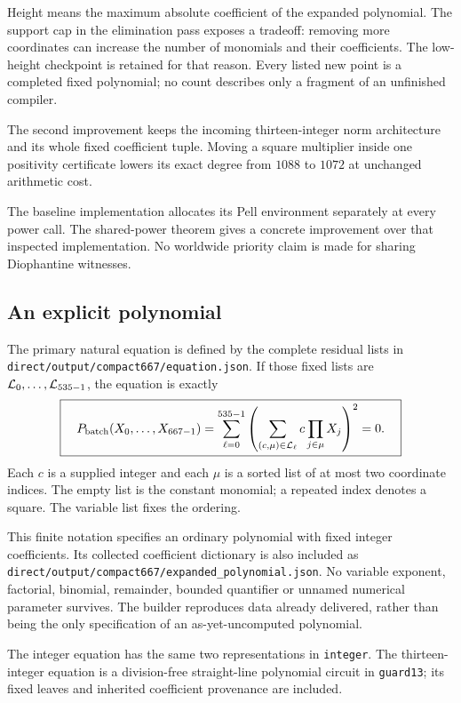 \documentclass[11pt,letterpaper]{article}
\newcommand{\file}[1]{\nolinkurl{#1}}
\begin{document}


Height means the maximum absolute coefficient of the expanded
polynomial. The support cap in the elimination pass exposes a tradeoff:
removing more coordinates can increase the number of monomials and
their coefficients. The low-height checkpoint is retained for that
reason. Every listed new point is a completed fixed polynomial;
no count describes only a fragment of an unfinished compiler.

The second improvement keeps the incoming thirteen-integer norm
architecture and its whole fixed coefficient tuple. Moving a square
multiplier inside one positivity certificate lowers its exact degree
from $1088$ to $1072$ at unchanged arithmetic cost.

The baseline implementation allocates its Pell environment separately
at every power call. The shared-power theorem gives a concrete
improvement over that inspected implementation. No worldwide
priority claim is made for sharing Diophantine witnesses.

\subsection{An explicit polynomial}

The primary natural equation is defined by the complete residual lists in
\file{direct/output/compact667/equation.json}. If those fixed lists are
$\mathcal L_0,\ldots,\mathcal L_{535-1}$, the equation is exactly
\begin{equation}
\boxed{\quad
 P_{\mathrm{batch}}(X_0,\ldots,X_{667-1})
 =
 \sum_{\ell=0}^{535-1}
 \left(\sum_{(c,\mu)\in\mathcal L_\ell}
           c\prod_{j\in\mu}X_j\right)^2=0.
 \quad}
\label{eq:literal}
\end{equation}
Each $c$ is a supplied integer and each $\mu$ is a sorted list of
at most two coordinate indices. The empty list is the constant
monomial; a repeated index denotes a square. The variable list
fixes the ordering.

This finite notation specifies an ordinary polynomial with fixed
integer coefficients. Its collected coefficient dictionary is also
included as \file{direct/output/compact667/expanded_polynomial.json}.
No variable exponent, factorial, binomial, remainder, bounded
quantifier or unnamed numerical parameter survives. The builder
reproduces data already delivered, rather than being the only
specification of an as-yet-uncomputed polynomial.

The integer equation has the same two representations in
\file{integer}. The thirteen-integer equation is a division-free
straight-line polynomial circuit in \file{guard13}; its fixed
leaves and inherited coefficient provenance are included.
\end{document}
